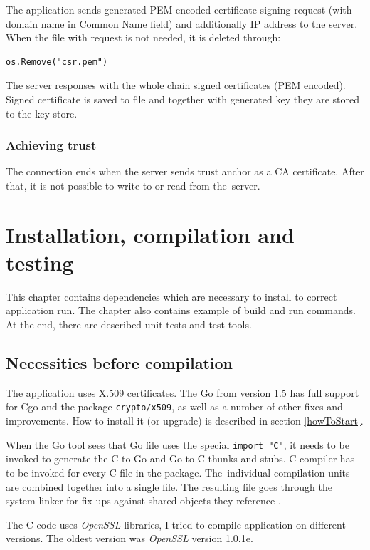 \documentclass[
  12pt, 
  digital, %
  notable,   %
  nolof,     %
  nolot,     %
]{fithesis3}
\begin{document}
The application sends generated PEM encoded certificate signing request (with domain name in Common Name field) and additionally IP address to the server. When the file with request is not needed, it is deleted through:
\begin{lstlisting}
os.Remove("csr.pem")
\end{lstlisting}
The server responses with the whole chain signed certificates (PEM encoded). Signed certificate is saved to file and together with generated key they are stored to the key store.

\subsection{Achieving trust}

The connection ends when the server sends trust anchor as a CA certificate. After that, it is not 
possible to write to or read from the~server. 

\chapter{Installation, compilation and testing}

This chapter contains dependencies which are necessary to install to correct application run. The 
chapter also contains example of build and run commands. At the end, there are described unit tests and test tools.


\section{Necessities before compilation}

The application uses X.509 certificates. The Go from version 1.5 has full support for Cgo 
and the package \texttt{crypto/x509}, as well as a number of other fixes and improvements. How to 
install it (or upgrade) is described in section \ref{howToStart}.

When the Go tool sees that Go file uses the special \texttt{import "C"}, it needs to be invoked to 
generate the C to Go and Go to C thunks and stubs. C compiler has to be invoked for every C file 
in the package. The~individual compilation units are combined together into a single file. The 
resulting file goes through the system linker for fix-ups against shared objects they 
reference \cite{dave}. 

The C code uses \textit{OpenSSL} libraries, I tried to compile application on different versions. 
The oldest version was \textit{OpenSSL} version 1.0.1e. 
\end{document}
